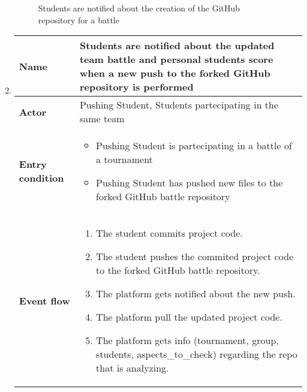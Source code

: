 \begin{enumerate}[label=\textbf{UC\arabic*}:,leftmargin=1.3cm]
            \begin{figure}[H]
                  \centering
                  \caption{Students are notified about the creation of the GitHub repository for a battle}
                  \label{fig:Students are notified about the creation of the GitHub repository for a battle}
            \end{figure}
            \pagebreak
      \item \textbf{}
            \begin{table}[H]
                  \centering
                  \begin{tabular}{|l|p{11.9cm}|}
                        \hline
                        \textbf{Name}            & Students are notified about the updated team battle and personal students score when a new push to the forked GitHub repository is performed \\\hline
                        \textbf{Actor}           & Pushing Student, Students partecipating in the same team                                                                                     \\\hline
                        \textbf{Entry condition} &
                        \begin{itemize}
                              \item Pushing Student is partecipating in a battle of a tournament
                              \item Pushing Student has pushed new files to the forked GitHub battle repository
                        \end{itemize}                                                                                        \\\hline
                        \textbf{Event flow}      &
                        \begin{enumerate}[label=\arabic*.]
                              \item The student commits project code.
                              \item The student pushes the commited project code to the forked GitHub battle repository.
                              \item The platform gets notified about the new push.
                              \item The platform pull the updated project code.
                              \item The platform gets info (tournament, group, students, aspects_to_check) regarding the repo that is analyzing.

\end{enumerate}
\end{tabular}
\end{table}
\end{enumerate}
